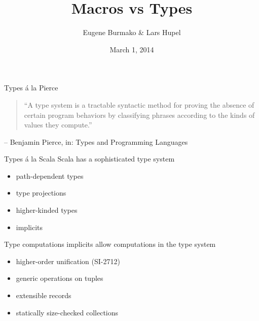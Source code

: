 \documentclass{beamer}
\begin{document}
  \title{Macros vs Types}
  \author{Eugene Burmako \& Lars Hupel}
  \date{March 1, 2014}

\begin{frame}
  \maketitle
\end{frame}

\begin{frame}
\vskip40pt
\begin{center}
\end{center}
\end{frame}

\begin{frame}{Types \'a la Pierce}
  \begin{quote}
    ``A type system is a tractable syntactic method for \alert<2>{proving the absence of certain program behaviors} by classifying phrases according to the kinds of values they compute.''
  \end{quote}
  \hfill -- Benjamin Pierce, in: Types and Programming Languages
\end{frame}

\begin{frame}{Types \'a la Scala}
  Scala has a sophisticated type system
  \begin{itemize}
    \item path-dependent types
    \item type projections
    \item higher-kinded types
    \item implicits
  \end{itemize}
\end{frame}

\begin{frame}{Type computations}
  implicits allow computations in the type system

  \begin{itemize}
    \item higher-order unification (SI-2712)
    \item generic operations on tuples
    \item extensible records
    \item statically size-checked collections
  \end{itemize}
\end{frame}
\end{document}
